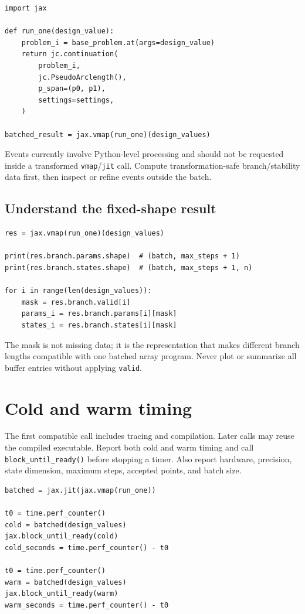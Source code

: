 \documentclass[11pt,oneside]{book}
\begin{document}
\begin{lstlisting}
import jax

def run_one(design_value):
    problem_i = base_problem.at(args=design_value)
    return jc.continuation(
        problem_i,
        jc.PseudoArclength(),
        p_span=(p0, p1),
        settings=settings,
    )

batched_result = jax.vmap(run_one)(design_values)
\end{lstlisting}

Events currently involve Python-level processing and should not be requested
inside a transformed \texttt{vmap}/\texttt{jit} call. Compute transformation-safe
branch/stability data first, then inspect or refine events outside the batch.

\subsection{Understand the fixed-shape result}

\begin{lstlisting}
res = jax.vmap(run_one)(design_values)

print(res.branch.params.shape)  # (batch, max_steps + 1)
print(res.branch.states.shape)  # (batch, max_steps + 1, n)

for i in range(len(design_values)):
    mask = res.branch.valid[i]
    params_i = res.branch.params[i][mask]
    states_i = res.branch.states[i][mask]
\end{lstlisting}

The mask is not missing data; it is the representation that makes different
branch lengths compatible with one batched array program. Never plot or
summarize all buffer entries without applying \texttt{valid}.

\section{Cold and warm timing}

The first compatible call includes tracing and compilation. Later calls may
reuse the compiled executable. Report both cold and warm timing and call
\texttt{block\_until\_ready()} before stopping a timer. Also report hardware,
precision, state dimension, maximum steps, accepted points, and batch size.

\begin{lstlisting}
batched = jax.jit(jax.vmap(run_one))

t0 = time.perf_counter()
cold = batched(design_values)
jax.block_until_ready(cold)
cold_seconds = time.perf_counter() - t0

t0 = time.perf_counter()
warm = batched(design_values)
jax.block_until_ready(warm)
warm_seconds = time.perf_counter() - t0
\end{lstlisting}
\end{document}
